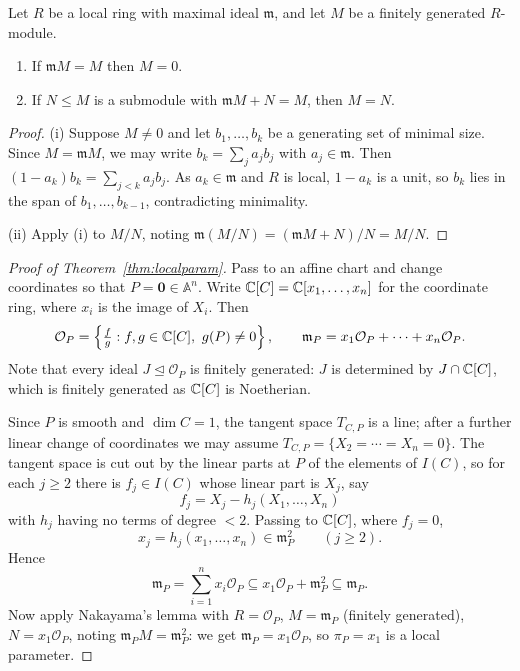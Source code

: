 \documentclass[a4paper]{scrartcl}
\newcommand{\A}{\mathbb{A}}
\newcommand{\mm}{\mathfrak{m}}
\newcommand{\Oh}{\mathcal{O}}
\begin{document}
\begin{lemma}[Nakayama]\label{lem:nakayama}
	Let $R$ be a local ring with maximal ideal $\mm$, and let $M$ be a finitely generated $R$-module.
	\begin{enumerate}[label=(\roman*)]
		\item If $\mm M = M$ then $M = 0$.
		\item If $N \leq M$ is a submodule with $\mm M + N = M$, then $M = N$.
	\end{enumerate}
\end{lemma}

\begin{proof}
	(i) Suppose $M \neq 0$ and let $b_1,\dots,b_k$ be a generating set of minimal size. Since $M = \mm M$, we may write $b_k = \sum_j a_j b_j$ with $a_j \in \mm$. Then $(1-a_k)b_k = \sum_{j<k} a_jb_j$. As $a_k \in \mm$ and $R$ is local, $1 - a_k$ is a unit, so $b_k$ lies in the span of $b_1,\dots,b_{k-1}$, contradicting minimality.

	(ii) Apply (i) to $M/N$, noting $\mm(M/N) = (\mm M + N)/N = M/N$.
\end{proof}

\begin{proof}[Proof of Theorem~\ref{thm:localparam}]
	Pass to an affine chart and change coordinates so that $P = \mathbf 0 \in \A^n$. Write $\mathbb{C}[C] = \mathbb{C}[x_1,\dots,x_n]$ for the coordinate ring, where $x_i$ is the image of $X_i$. Then
	$$\Oh_P = \left\{\tfrac fg : f,g \in \C[C],\ g(P) \neq 0\right\}, \qquad \mm_P = x_1\Oh_P + \cdots + x_n\Oh_P.$$
	Note that every ideal $J \trianglelefteq \Oh_P$ is finitely generated: $J$ is determined by $J \cap \mathbb{C}[C]$, which is finitely generated as $\mathbb{C}[C]$ is Noetherian.

	Since $P$ is smooth and $\dim C = 1$, the tangent space $T_{C,P}$ is a line; after a further linear change of coordinates we may assume $T_{C,P} = \{X_2 = \cdots = X_n = 0\}$. The tangent space is cut out by the linear parts at $P$ of the elements of $I(C)$, so for each $j \geq 2$ there is $f_j \in I(C)$ whose linear part is $X_j$, say
	$$f_j = X_j - h_j(X_1,\dots,X_n)$$
	with $h_j$ having no terms of degree $< 2$. Passing to $\mathbb{C}[C]$, where $f_j = 0$,
	$$x_j = h_j(x_1,\dots,x_n) \in \mm_P^2 \qquad (j \geq 2).$$
	Hence
	$$\mm_P = \sum_{i=1}^n x_i\Oh_P \subseteq x_1\Oh_P + \mm_P^2 \subseteq \mm_P.$$
	Now apply Nakayama's lemma with $R = \Oh_P$, $M = \mm_P$ (finitely generated), $N = x_1\Oh_P$, noting $\mm_P M = \mm_P^2$: we get $\mm_P = x_1\Oh_P$, so $\pi_P = x_1$ is a local parameter.
\end{proof}
\end{document}

